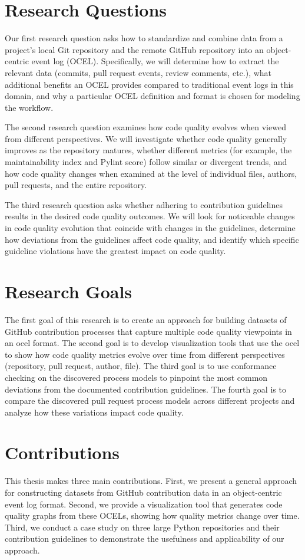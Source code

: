 \section{Research Questions}
Our first research question asks how to standardize and combine data from a project’s local Git repository and the remote GitHub repository into an object-centric event log (OCEL). Specifically, we will determine how to extract the relevant data (commits, pull request events, review comments, etc.), what additional benefits an OCEL provides compared to traditional event logs in this domain, and why a particular OCEL definition and format is chosen for modeling the workflow.

The second research question examines how code quality evolves when viewed from different perspectives. We will investigate whether code quality generally improves as the repository matures, whether different metrics (for example, the maintainability index and Pylint score) follow similar or divergent trends, and how code quality changes when examined at the level of individual files, authors, pull requests, and the entire repository.

The third research question asks whether adhering to contribution guidelines results in the desired code quality outcomes. We will look for noticeable changes in code quality evolution that coincide with changes in the guidelines, determine how deviations from the guidelines affect code quality, and identify which specific guideline violations have the greatest impact on code quality.

\section{Research Goals}
The first goal of this research is to create an approach for building datasets of GitHub contribution processes that capture multiple code quality viewpoints in an \ac{ocel} format. The second goal is to develop visualization tools that use the \ac{ocel} to show how code quality metrics evolve over time from different perspectives (repository, pull request, author, file). The third goal is to use conformance checking on the discovered process models to pinpoint the most common deviations from the documented contribution guidelines. The fourth goal is to compare the discovered pull request process models across different projects and analyze how these variations impact code quality.

\section{Contributions}
This thesis makes three main contributions. First, we present a general approach for constructing datasets from GitHub contribution data in an object-centric event log format. Second, we provide a visualization tool that generates code quality graphs from these OCELs, showing how quality metrics change over time. Third, we conduct a case study on three large Python repositories and their contribution guidelines to demonstrate the usefulness and applicability of our approach.

